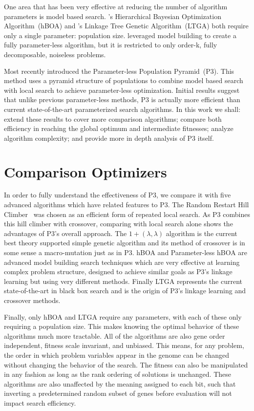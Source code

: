 \documentclass[twoside]{article}
\begin{document}
One area that has been very effective at reducing the number of algorithm parameters is
model based search. \cite{pelikan:2006:hboa}'s Hierarchical Bayesian Optimization
Algorithm~(hBOA) and \cite{thierens:2010:ltga}'s Linkage Tree Genetic Algorithm~(LTGA)
both require only a single parameter: population size. \cite{posik:2011:parameterless}
leveraged model building to create a fully parameter-less algorithm, but it is restricted to
only order-k, fully decomposable, noiseless problems.

Most recently \cite{goldman:2014:p3} introduced the Parameter-less Population Pyramid~(P3).
This method uses a pyramid structure of populations to combine model based search with local search
to achieve parameter-less optimization. Initial results suggest that unlike
previous parameter-less methods, P3 is actually more efficient than current state-of-the-art
parameterized search algorithms. In this work we shall: extend these results to cover more
comparison algorithms; compare both efficiency in reaching the global optimum and intermediate
fitnesses; analyze algorithm complexity; and provide more in depth analysis of P3 itself.

\section{Comparison Optimizers}
\label{sec-optimizers}

In order to fully understand the effectiveness of P3, we compare it with five advanced algorithms which
have related features to P3. The Random Restart Hill Climber~\citep{goldman:2014:p3} was chosen as an efficient form of repeated
local search. As P3 combines this hill climber with crossover,
comparing with local search alone shows the advantages of P3's overall approach.
The $1+(\lambda, \lambda)$ algorithm is the current best theory supported simple genetic algorithm
and its method of crossover is in some sense a macro-mutation just as in P3. hBOA and Parameter-less
hBOA are advanced model building search techniques which are very effective at learning complex
problem structure, designed to achieve similar goals as P3's linkage learning but using very different
methods. Finally LTGA represents the current state-of-the-art in black box search and is the origin
of P3's linkage learning and crossover methods.

Finally, only hBOA and LTGA require any parameters, with each of these only requiring a population
size. This makes knowing the optimal behavior of these algorithms much more tractable. All of the
algorithms are also gene order independent, fitness scale invariant, and unbiased. This means,
for any problem, the order in which problem variables appear in the genome can be changed
without changing the behavior of the search. The fitness can also be manipulated in any fashion
as long as the rank ordering of solutions is unchanged. These algorithms are also unaffected by the meaning
assigned to each bit, such that inverting a predetermined random subset of genes before evaluation
will not impact search efficiency.
\end{document}
